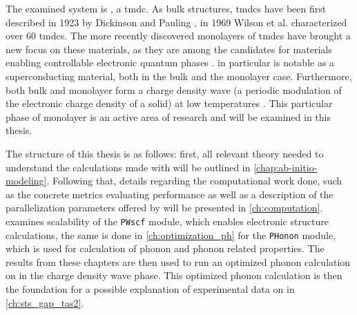 \documentclass[main.tex]{subfiles}
\begin{document}
The examined system is \TaS, a \acrfull{tmdc}.
As bulk structures, \acrshort{tmdc}s have been first described in 1923 by Dickinson and Pauling \cite{dickinson_crystal_1923}, in 1969 Wilson et al. characterized over 60 \acrshort{tmdc}s.
The more recently discovered monolayers of \acrshort{tmdc}s \cite{novoselov_two-dimensional_2005} have brought a new focus on these materials, as they are among the candidates for materials enabling controllable electronic quantum phases \cite{basov_towards_2017}.
\TaS in particular is notable as a superconducting material, both in the bulk and the monolayer case.
Furthermore, both bulk and monolayer \TaS form a charge density wave (a periodic modulation of the electronic charge density of a solid) at low temperatures \cite{hall_environmental_2019}.
This particular phase of monolayer \TaS is an active area of research and will be examined in this thesis.

The structure of this thesis is as follows:
first, all relevant theory needed to understand the calculations made with \QE will be outlined in \cref{chap:ab-initio-modeling}.
Following that, details regarding the computational work done, such as the concrete metrics evaluating performance as well as a description of the parallelization parameters offered by \QE will be presented in \cref{ch:computation}.
 examines scalability of the \texttt{PWscf} module, which enables electronic structure calculations, the same is done in \cref{ch:optimization_ph} for the \texttt{PHonon} module, which is used for calculation of phonon and phonon related properties. 
The results from these chapters are then used to run an optimized phonon calculation on \TaS in the charge density wave phase.
This optimized phonon calculation is then the foundation for a possible explanation of experimental data on \TaS in \cref{ch:sts_gap_tas2}.
\end{document}
